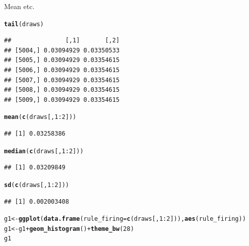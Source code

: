 \documentclass{article}\usepackage[]{graphicx}\usepackage[]{color}
\makeatletter
\newcommand{\hlnum}[1]{\textcolor[rgb]{0.686,0.059,0.569}{#1}}%
\newcommand{\hlopt}[1]{\textcolor[rgb]{0,0,0}{#1}}%
\newcommand{\hlstd}[1]{\textcolor[rgb]{0.345,0.345,0.345}{#1}}%
\newcommand{\hlkwb}[1]{\textcolor[rgb]{0.69,0.353,0.396}{#1}}%
\newcommand{\hlkwc}[1]{\textcolor[rgb]{0.333,0.667,0.333}{#1}}%
\newcommand{\hlkwd}[1]{\textcolor[rgb]{0.737,0.353,0.396}{\textbf{#1}}}%
\newenvironment{kframe}{%
 \def\at@end@of@kframe{}%
 \ifinner\ifhmode%
  \def\at@end@of@kframe{\end{minipage}}%
  \begin{minipage}{\columnwidth}%
 \fi\fi%
 \def\FrameCommand##1{\hskip\@totalleftmargin \hskip-\fboxsep
 \colorbox{shadecolor}{##1}\hskip-\fboxsep
     \hskip-\linewidth \hskip-\@totalleftmargin \hskip\columnwidth}%
 \MakeFramed {\advance\hsize-\width
   \@totalleftmargin\z@ \linewidth\hsize
   \@setminipage}}%
 {\par\unskip\endMakeFramed%
 \at@end@of@kframe}
\newenvironment{knitrout}{}{} %
\makeatother
\begin{document}
Mean etc.

\begin{knitrout}
\color{fgcolor}\begin{kframe}
\begin{alltt}
\hlkwd{tail}\hlstd{(draws)}
\end{alltt}
\begin{verbatim}
##               [,1]       [,2]
## [5004,] 0.03094929 0.03350533
## [5005,] 0.03094929 0.03354615
## [5006,] 0.03094929 0.03354615
## [5007,] 0.03094929 0.03354615
## [5008,] 0.03094929 0.03354615
## [5009,] 0.03094929 0.03354615
\end{verbatim}
\begin{alltt}
\hlkwd{mean}\hlstd{(}\hlkwd{c}\hlstd{(draws[,} \hlnum{1}\hlopt{:}\hlnum{2}\hlstd{]))}
\end{alltt}
\begin{verbatim}
## [1] 0.03258386
\end{verbatim}
\begin{alltt}
\hlkwd{median}\hlstd{(}\hlkwd{c}\hlstd{(draws[,} \hlnum{1}\hlopt{:}\hlnum{2}\hlstd{]))}
\end{alltt}
\begin{verbatim}
## [1] 0.03209849
\end{verbatim}
\begin{alltt}
\hlkwd{sd}\hlstd{(}\hlkwd{c}\hlstd{(draws[,} \hlnum{1}\hlopt{:}\hlnum{2}\hlstd{]))}
\end{alltt}
\begin{verbatim}
## [1] 0.002003408
\end{verbatim}
\begin{alltt}
\hlstd{g1} \hlkwb{<-} \hlkwd{ggplot}\hlstd{(}\hlkwd{data.frame}\hlstd{(}\hlkwc{rule_firing} \hlstd{=} \hlkwd{c}\hlstd{(draws[,} \hlnum{1}\hlopt{:}\hlnum{2}\hlstd{])),} \hlkwd{aes}\hlstd{(rule_firing))}
\hlstd{g1} \hlkwb{<-} \hlstd{g1} \hlopt{+} \hlkwd{geom_histogram}\hlstd{()} \hlopt{+} \hlkwd{theme_bw}\hlstd{(}\hlnum{28}\hlstd{)}
\hlstd{g1}
\end{alltt}



\end{kframe}
\end{knitrout}
\end{document}

